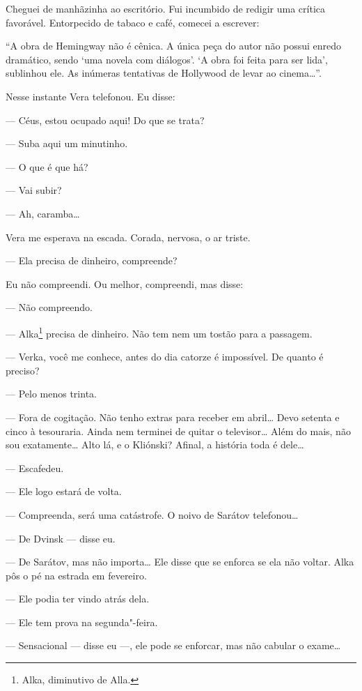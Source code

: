 Cheguei de manhãzinha ao escritório. Fui incumbido de redigir uma
crítica favorável. Entorpecido de tabaco e café, comecei a escrever:

``A obra de Hemingway não é cênica. A única peça do autor não possui
enredo dramático, sendo `uma novela com diálogos'. `A obra foi feita
para ser lida', sublinhou ele. As inúmeras tentativas de Hollywood de
levar ao cinema\ldots{}''.

Nesse instante Vera telefonou. Eu disse:

--- Céus, estou ocupado aqui! Do que se trata?

--- Suba aqui um minutinho.

--- O que é que há?

--- Vai subir?

--- Ah, caramba\ldots{}

Vera me esperava na escada. Corada, nervosa, o ar triste.

--- Ela precisa de dinheiro, compreende?

Eu não compreendi. Ou melhor, compreendi, mas disse:

--- Não compreendo.

--- Alka\footnote{Alka, diminutivo de Alla.} precisa de dinheiro. Não
tem nem um tostão para a passagem.

--- Verka, você me conhece, antes do dia catorze é impossível. De quanto
é preciso?

--- Pelo menos trinta.

--- Fora de cogitação. Não tenho extras para receber em abril\ldots{} Devo
setenta e cinco à tesouraria. Ainda nem terminei de quitar o
televisor\ldots{} Além do mais, não sou exatamente\ldots{} Alto lá, e o Kliónski?
Afinal, a história toda é dele\ldots{}

--- Escafedeu.

--- Ele logo estará de volta.

--- Compreenda, será uma catástrofe. O noivo de Sarátov telefonou\ldots{}

--- De Dvinsk --- disse eu.

--- De Sarátov, mas não importa\ldots{} Ele disse que se enforca se ela não
voltar. Alka pôs o pé na estrada em fevereiro.

--- Ele podia ter vindo atrás dela.

--- Ele tem prova na segunda"-feira.

--- Sensacional --- disse eu ---, ele pode se enforcar, mas não cabular
o exame\ldots{}

